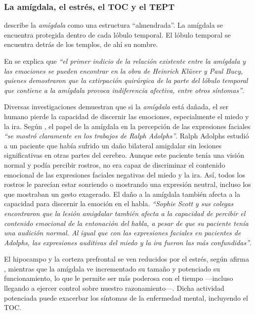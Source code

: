 \subsubsection{La amígdala, el estrés, el \acs{TOC} y el \acs{TEPT}}

\cite{Czerner2001} describe la {\it amígdala} como una estructura ``almendrada''. La amígdala se encuentra protegida dentro de cada lóbulo temporal. El lóbulo temporal se encuentra detrás de los templos, de ahí su nombre.

En \cite{Damasio1994} se explica que {\it ``el primer indicio de la relación existente entre la amígdala y las emociones se pueden encontrar en la obra de Heinrich Klüver y Paul Bucy, quienes demostraron que la extirpación quirúrgica de la parte del lóbulo temporal que contiene a la amígdala provoca indiferencia afectiva, entre otros síntomas''}.

Diversas investigaciones demuestran que si la {\it amígdala} está dañada, el ser humano pierde la capacidad de discernir las emociones, especialmente el miedo y la ira. Según \cite{JohnAllman2000}, el papel de la amígdala en la percepción de las expresiones faciales {\it ``se mostró claramente en los trabajos de Ralph Adolphs''}. Ralph Adolphs estudió a un paciente que había sufrido un daño bilateral amigdalar sin lesiones significativas en otras partes del cerebro. Aunque este paciente tenía una visión normal y podía percibir rostros, no era capaz de discriminar el contenido emocional de las expresiones faciales negativas del miedo y la ira. Así, todos los rostros le parecían estar sonriendo o mostrando una expresión neutral, incluso los que mostraban un gesto exagerado. El daño a la amígdala también afecta a la capacidad para discernir la emoción en el habla. {\it ``Sophie Scott y sus colegas encontraron que la lesión amigdalar también afecta a la capacidad de percibir el contenido emocional de la entonación del habla, a pesar de que su paciente tenía una audición normal. Al igual que con las expresiones faciales en pacientes de Adolphs, las expresiones auditivas del miedo y la ira fueron las más confundidas''}.

El hipocampo y la corteza prefrontal se ven reducidos por el estrés, según afirma \cite{Pittenger2008}, mientras que la amígdala ve incrementado su tamaño y potenciado su funcionamiento, lo que le permite ser más poderosa con el tiempo ---incluso llegando a ejercer control sobre nuestro razonamiento---. Dicha actividad potenciada puede exacerbar los síntomas de la enfermedad mental, incluyendo el \acs{TOC}.


